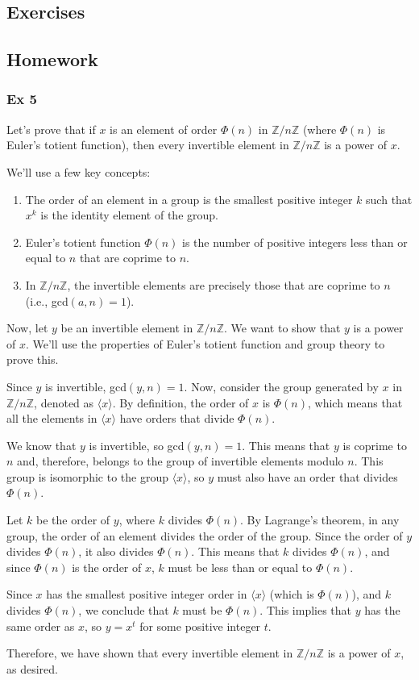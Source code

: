 \subsection{Exercises}

\subsection{Homework}
\subsubsection*{Ex 5}
Let's prove that if $x$ is an element of order $\Phi(n)$ in $\mathbb{Z}/n\mathbb{Z}$ (where $\Phi(n)$ is Euler's totient function), then every invertible element in $\mathbb{Z}/n\mathbb{Z}$ is a power of $x$.

We'll use a few key concepts:

\begin{enumerate}
    \item The order of an element in a group is the smallest positive integer $k$ such that $x^k$ is the identity element of the group.
    \item Euler's totient function $\Phi(n)$ is the number of positive integers less than or equal to $n$ that are coprime to $n$.
    \item In $\mathbb{Z}/n\mathbb{Z}$, the invertible elements are precisely those that are coprime to $n$ (i.e., gcd$(a, n) = 1$).
\end{enumerate}

Now, let $y$ be an invertible element in $\mathbb{Z}/n\mathbb{Z}$. We want to show that $y$ is a power of $x$. We'll use the properties of Euler's totient function and group theory to prove this.

Since $y$ is invertible, gcd$(y, n) = 1$. Now, consider the group generated by $x$ in $\mathbb{Z}/n\mathbb{Z}$, denoted as $\langle x \rangle$. By definition, the order of $x$ is $\Phi(n)$, which means that all the elements in $\langle x \rangle$ have orders that divide $\Phi(n)$.

We know that $y$ is invertible, so gcd$(y, n) = 1$. This means that $y$ is coprime to $n$ and, therefore, belongs to the group of invertible elements modulo $n$. This group is isomorphic to the group $\langle x \rangle$, so $y$ must also have an order that divides $\Phi(n)$.

Let $k$ be the order of $y$, where $k$ divides $\Phi(n)$. By Lagrange's theorem, in any group, the order of an element divides the order of the group. Since the order of $y$ divides $\Phi(n)$, it also divides $\Phi(n)$. This means that $k$ divides $\Phi(n)$, and since $\Phi(n)$ is the order of $x$, $k$ must be less than or equal to $\Phi(n)$.

Since $x$ has the smallest positive integer order in $\langle x \rangle$ (which is $\Phi(n)$), and $k$ divides $\Phi(n)$, we conclude that $k$ must be $\Phi(n)$. This implies that $y$ has the same order as $x$, so $y = x^t$ for some positive integer $t$.

Therefore, we have shown that every invertible element in $\mathbb{Z}/n\mathbb{Z}$ is a power of $x$, as desired.